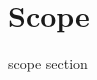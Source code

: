 \documentclass[../../../../dd.tex]{subfiles}
\begin{document}
	\section{Scope}

	scope section
\end{document}
